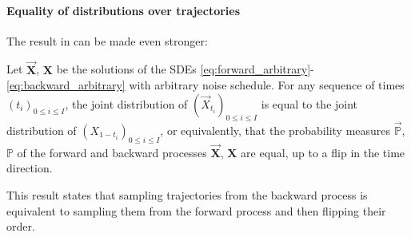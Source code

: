 \paragraph{Equality of distributions over trajectories} The result in  can be made even stronger:
\begin{proposition} \label{lem:equal_process_distributions}
    Let $\vec{\bm{X}}$, $\bm{X}$ be the solutions of the SDEs \eqref{eq:forward_arbitrary}-\eqref{eq:backward_arbitrary} with arbitrary noise schedule. For any sequence of times $(t_i)_{0 \leq i \leq I}$, the joint distribution of $(\vec{X}_{t_i})_{0 \leq i \leq I}$ is equal to the joint distribution of $(X_{1-t_i})_{0 \leq i \leq I}$, or equivalently, that the probability measures $\vec{\mathbb{P}}$, $\mathbb{P}$ of the forward and backward processes $\vec{\bm{X}}$, $\bm{X}$ are equal, up to a flip in the time direction.
\end{proposition}
This result states that sampling trajectories from the backward process is equivalent to sampling them from the forward process and then flipping their order.

